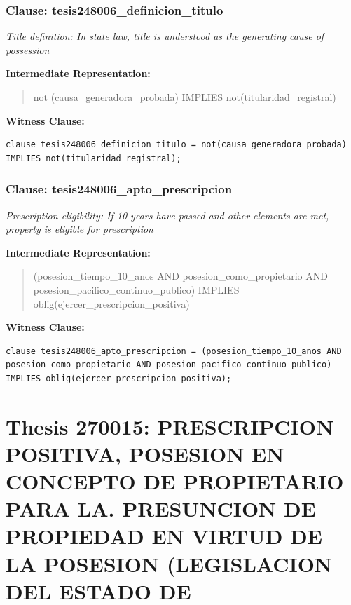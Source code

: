 \documentclass[11pt,a4paper]{article}
\begin{document}
\subsubsection{Clause: tesis248006\_definicion\_titulo}

\textit{Title definition: In state law, title is understood as the generating cause of possession}

\textbf{Intermediate Representation:}

\begin{quote}
not (causa\_generadora\_probada) IMPLIES not(titularidad\_registral)
\end{quote}

\textbf{Witness Clause:}

\begin{lstlisting}[style=witnessstyle, language=Witness]
clause tesis248006_definicion_titulo = not(causa_generadora_probada) IMPLIES not(titularidad_registral);
\end{lstlisting}

\subsubsection{Clause: tesis248006\_apto\_prescripcion}

\textit{Prescription eligibility: If 10 years have passed and other elements are met, property is eligible for prescription}

\textbf{Intermediate Representation:}

\begin{quote}
(posesion\_tiempo\_10\_anos AND posesion\_como\_propietario AND posesion\_pacifico\_continuo\_publico) IMPLIES oblig(ejercer\_prescripcion\_positiva)
\end{quote}

\textbf{Witness Clause:}

\begin{lstlisting}[style=witnessstyle, language=Witness]
clause tesis248006_apto_prescripcion = (posesion_tiempo_10_anos AND posesion_como_propietario AND posesion_pacifico_continuo_publico) IMPLIES oblig(ejercer_prescripcion_positiva);
\end{lstlisting}

\newpage

\section{Thesis 270015: PRESCRIPCION POSITIVA, POSESION EN CONCEPTO DE PROPIETARIO PARA LA. PRESUNCION DE PROPIEDAD EN VIRTUD DE LA POSESION (LEGISLACION DEL ESTADO DE}
\label{thesis:270015}
\end{document}
